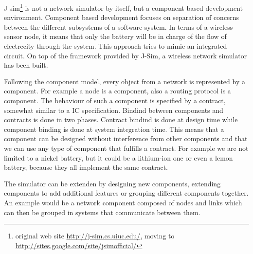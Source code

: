 \label{subsec:jsim}
J-sim\footnote {original web site \url{http://j-sim.cs.uiuc.edu/}, moving to 
\url{http://sites.google.com/site/jsimofficial/}} is not a network simulator
by itself, but a component based development environment. Component based
development focuses on separation of concerns between the different subsystems
of a software system. In terms of a wireless sensor node, it means that only 
the battery will be in charge of the flow of electrecity through the system.
This approach tries to mimic an integrated circuit. On top of the framework 
provided by J-Sim, a wireless network simulator has been built.

Following the component model, every object from a network is represented
by a component. For example a node is a component, also a routing protocol
is a component. The behaviour of such a component is specified by a contract,
somewhat similar to a IC specification. Bindind between components and contracts
is done in two phases. Contract bindind is done at design time while component
binding is done at system integration time. This means that a component can be
designed without interference from other components and that we can use any type
of component that fulfills a contract. For example we are not limited to a nickel
battery, but it could be a lithium-ion one or even a lemon battery, because they all
implement the same contract.

The simulator can be extenden by designing new components, extending components to add
additional features or grouping different components together. An example would be a 
network component composed of nodes and links which can then be grouped in systems that
communicate between them.
